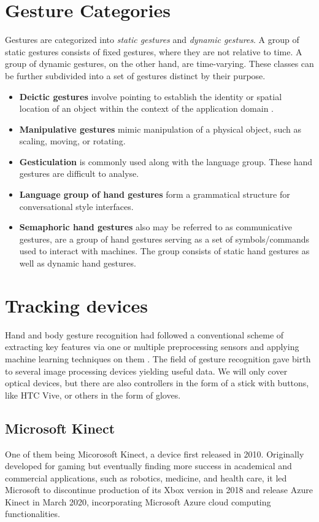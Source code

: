
\section{Gesture Categories}
Gestures are categorized into \textit{static gestures} and \textit{dynamic gestures}. A group of static gestures consists of fixed gestures, where they are not relative to time. A group of dynamic gestures, on the other hand, are time-varying. These classes can be further subdivided into a set of gestures distinct by their purpose.


\begin{itemize}
	\item \textbf{Deictic gestures} involve pointing to establish the identity or spatial location of an object within the context of the application domain \cite{taxonomi}.
    \item \textbf{Manipulative gestures} mimic manipulation of a physical object, such as scaling, moving, or rotating.
    \item \textbf{Gesticulation} is commonly used along with the language group. These hand gestures are difficult to analyse.
	\item \textbf{Language group of hand gestures} form a grammatical structure for conversational style interfaces.
    \item \textbf{Semaphoric hand gestures} also may be referred to as communicative gestures, are a group of hand gestures serving as a set of symbols/commands used to interact with machines. The group consists of static hand gestures as well as dynamic hand gestures. 
\end{itemize}


\section{Tracking devices}
Hand and body gesture recognition had followed a conventional scheme of extracting key features via one or multiple preprocessing sensors and applying machine learning techniques on them \cite{avola}. The field of gesture recognition gave birth to several image processing devices yielding useful data.
We will only cover optical devices, but there are also controllers in the form of a stick with buttons, like HTC Vive, or others in the form of gloves.
\subsection{Microsoft Kinect}
One of them being Micorosoft Kinect, a device first released in 2010. Originally developed for gaming but eventually finding more success in academical and commercial applications, such as robotics, medicine, and health care, it led Microsoft to discontinue production of its Xbox version in 2018 and release Azure Kinect in March 2020, incorporating Microsoft Azure cloud computing functionalities.

